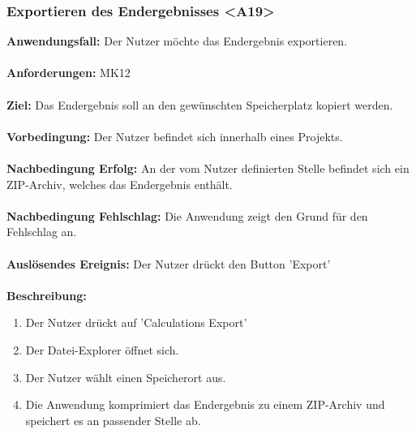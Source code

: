 \documentclass[parskip=full]{scrartcl} %
\begin{document}
\subsubsection*{Exportieren des Endergebnisses <A19>}
\textbf{Anwendungsfall:} Der Nutzer möchte das Endergebnis exportieren.\\\\
\textbf{Anforderungen:} MK12\\\\
\textbf{Ziel:} Das Endergebnis soll an den gewünschten Speicherplatz kopiert werden. \\\\
\textbf{Vorbedingung:}  Der Nutzer befindet sich innerhalb eines Projekts.\\\\
\textbf{Nachbedingung Erfolg:} An der vom Nutzer definierten Stelle befindet sich ein ZIP-Archiv, welches das Endergebnis enthält. \\\\
\textbf{Nachbedingung Fehlschlag:} Die Anwendung zeigt den Grund für den Fehlschlag an.\\\\
\textbf{Auslösendes Ereignis:} Der Nutzer drückt den Button 'Export' \\\\
\textbf{Beschreibung:}
\begin{enumerate}
    \item Der Nutzer drückt auf 'Calculations Export'
    \item Der Datei-Explorer öffnet sich.
    \item Der Nutzer wählt einen Speicherort aus.
    \item Die Anwendung komprimiert das Endergebnis zu einem ZIP-Archiv und speichert es an passender Stelle ab.
\end{enumerate}
\newpage
\end{document}
